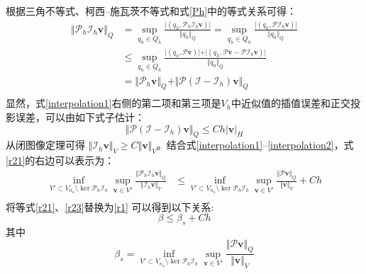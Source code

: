 根据三角不等式、柯西--施瓦茨不等式和式\eqref{Ph}中的等式关系可得：
\begin{equation}\label{interpolation1}
    \begin{split}
        \Vert \mathcal P_h \mathcal I_h \boldsymbol v \Vert_Q &= 
        \sup_{q_h \in Q_h} \frac{\vert (q_h, \mathcal P_h \mathcal I_h \boldsymbol v) \vert}{\Vert q_h \Vert_Q}
        =\sup_{q_h \in Q_h} \frac{\vert (q_h, \mathcal P \mathcal I_h \boldsymbol v) \vert}{\Vert q_h \Vert_Q} \\
        &\le \sup_{q_h \in Q_h} \frac{\vert (q_h, \mathcal P \boldsymbol v)\vert + \vert (q_h, \mathcal P \boldsymbol v - \mathcal P \mathcal I_h \boldsymbol v) \vert}{\Vert q_h \Vert_Q} \\
        &= \Vert \mathcal P_h \boldsymbol v \Vert_Q
        + \Vert \mathcal P(\mathcal I - \mathcal I_h) \boldsymbol v \Vert_Q \\
    \end{split}
\end{equation}
显然，式\eqref{interpolation1}右侧的第二项和第三项是$V_h$中近似值的插值误差和正交投影误差，可以由如下式子估计\cite{yosida1995}：
\begin{equation}\label{interpolation2}
        \Vert \mathcal P(\mathcal I - \mathcal I_h) \boldsymbol v \Vert_Q \le Ch \vert \boldsymbol v \vert_{H} 
\end{equation}
从闭图像定理\cite{quarteroni1994}可得 $\Vert \mathcal I_h \boldsymbol v\Vert_V \ge C\Vert \boldsymbol v \Vert_V$。结合式\eqref{interpolation1}--\eqref{interpolation2}，式\eqref{r21}的右边可以表示为：
\begin{equation}\label{r23}
    \begin{split}
        \inf_{V'\subset V_{n_u}\setminus \ker \mathcal P_h \mathcal I_h} \sup_{\boldsymbol v \in V'} \frac{\Vert \mathcal P_h\mathcal I_h\boldsymbol v\Vert_Q}{\Vert \mathcal I_h \boldsymbol v\Vert_V} 
        &\le \inf_{V'\subset V_{n_u}\setminus \ker \mathcal P_h \mathcal I_h} \sup_{\boldsymbol v \in V'} \frac{\Vert \mathcal P \boldsymbol v\Vert_Q}{\Vert \boldsymbol v\Vert_V} + Ch \\
    \end{split}
\end{equation}
将等式\eqref{r21}、\eqref{r23}替换为\eqref{r1} 可以得到以下关系:
\begin{equation}\label{r3}
    \beta \le \beta_s + Ch
\end{equation}
其中
\begin{equation}
    \beta_s = \inf_{V'\subset V_{n_u}\setminus\ker \mathcal P_h \mathcal I_h}\sup_{\boldsymbol v \in V'}\frac{\Vert \mathcal P \boldsymbol v\Vert_Q}{\Vert  \boldsymbol v\Vert_V} 
\end{equation}

